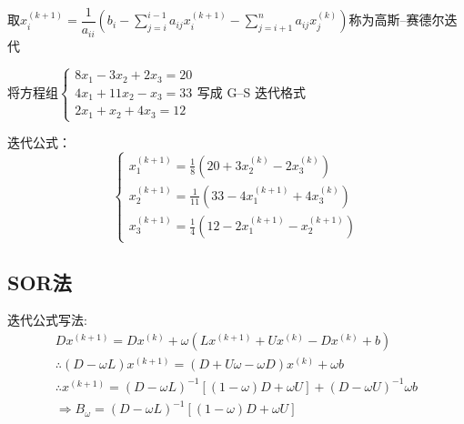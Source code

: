 \documentclass[UTF8,a4paper,11pt,oneside]{ctexbook}
\begin{document}
取\(x_i^{(k+1)}=\dfrac{1}{a_{ii}}\left(b_i-\sum\limits_{j=i}^{i-1}a_{ij}x_i^{(k+1)}-\sum\limits_{j=i+1}^na_{ij}x_j^{(k)}\right)\)称为高斯--赛德尔迭代

将方程组\(\begin{cases}
    8x_1-3x_2+2x_3=20\\
    4x_1+11x_2-x_3=33\\
    2x_1+x_2+4x_3=12
\end{cases}\)写成 G--S 迭代格式

迭代公式：
\[
\begin{cases}
    x_1^{(k+1)}=\frac{1}{8}(20+3x_2^{(k)}-2x_3^{(k)})\\
    x_2^{(k+1)}=\frac{1}{11}(33-4x_1^{(k+1)}+4x_3^{(k)})\\
    x_3^{(k+1)}=\frac{1}{4}(12-2x_1^{(k+1)}-x_2^{(k+1)})
\end{cases}
\]

\subsection{SOR法}

迭代公式写法:
\[
\begin{array}{l}
    Dx^{(k+1)}=Dx^{(k)}+\omega(Lx^{(k+1)}+Ux^{(k)}-Dx^{(k)}+b)\\
    \therefore(D-\omega L)x^{(k+1)}=(D+U\omega-\omega D)x^{(k)}+\omega b\\
    \therefore x^{(k+1)}=(D-\omega L)^{-1}[(1-\omega)D+\omega U]+(D-\omega U)^{-1}\omega b\\
    \Rightarrow B_{\omega}=(D-\omega L)^{-1}[(1-\omega)D+\omega U]
\end{array}
\]
\end{document}
